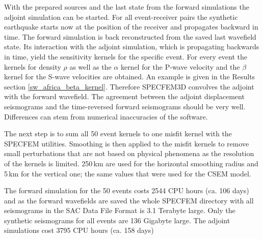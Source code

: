 With the prepared sources and the last state from the forward simulations the adjoint simulation can be started.
For all event-receiver pairs the synthetic earthquake starts now at the position of the receiver and propagates
backward in time.  
The forward simulation is back reconstructed from the saved last wavefield state. 
Its interaction with the adjoint simulation, which is propagating backwards in time,
yield the sensitivity kernels for the specific event. 
For every event the kernels for density $\rho$ as well as the $\alpha$ kernel for the P-wave velocity and the
$\beta$ kernel for the S-wave velocities are obtained. 
An example is given in the Results section \autoref{sw_africa_beta_kernel}.
Therefore SPECFEM3D convolves the adjoint with the forward wavefield.
The agreement between the adjoint displacement seismograms and the time-reversed forward seismograms should be very well. %
Differences can stem from numerical inaccuracies of the software. %

The next step is to sum all 50 event kernels to one misfit kernel with the SPECFEM utilities.
Smoothing is then applied to the misfit kernels to remove small perturbations that are not based on physical phenomena as the 
resolution of the kernels is limited.
250$\,$km are used for the horizontal smoothing radius and 5$\,$km for the vertical one; the same values that were used for the
CSEM model.

The forward simulation for the 50 events costs 2544 CPU hours (ca. 106 days) and as the forward wavefields are saved the whole 
SPECFEM directory with all seismograms in the SAC Data File Format is 3.1 Terabyte large.
Only the synthetic seismograms for all events are 136 Gigabyte large.
The adjoint simulations cost 3795 CPU hours (ca. 158 days)






